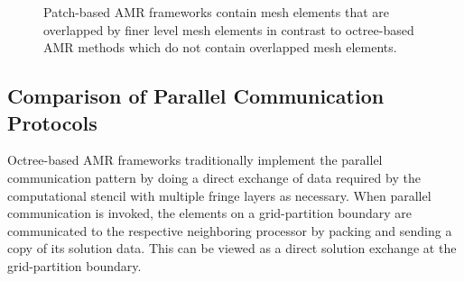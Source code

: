 \documentclass[11pt]{book}
\begin{document}
\begin{figure}[t]
 \begin{subfigmatrix}{2}%
  \label{Patch-AMR}
  \label{Octree-AMR}
 \end{subfigmatrix}
 \caption{Patch-based AMR frameworks contain mesh elements that are overlapped by finer level mesh elements in contrast to octree-based AMR methods which do not contain overlapped mesh elements.}
 \label{AMR-data-structures}
\end{figure}


\newpage
\subsection{Comparison of Parallel Communication Protocols}
Octree-based AMR frameworks traditionally implement the parallel communication pattern by doing a direct exchange of data 
required by the computational stencil with multiple fringe layers as necessary. When parallel communication is invoked, 
the elements on a grid-partition boundary are communicated to the respective neighboring processor by packing and sending 
a copy of its solution data. This can be viewed as a direct solution exchange at the grid-partition boundary.
\medskip
\end{document}
